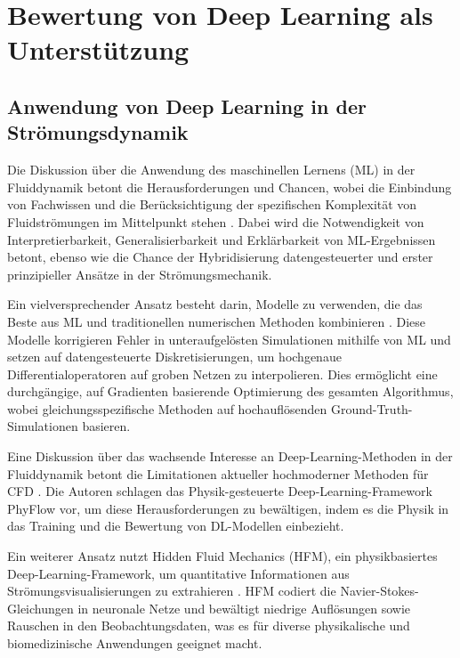 \section{Bewertung von Deep Learning als Unterstützung}

\subsection{Anwendung von Deep Learning in der Strömungsdynamik}
Die Diskussion über die Anwendung des maschinellen Lernens (ML) in der Fluiddynamik betont die Herausforderungen und Chancen, wobei die Einbindung von Fachwissen und die Berücksichtigung der spezifischen Komplexität von Fluidströmungen im Mittelpunkt stehen \parencite{bruntonMachineLearningFluid2020}. Dabei wird die Notwendigkeit von Interpretierbarkeit, Generalisierbarkeit und Erklärbarkeit von ML-Ergebnissen betont, ebenso wie die Chance der Hybridisierung datengesteuerter und erster prinzipieller Ansätze in der Strömungsmechanik.

Ein vielversprechender Ansatz besteht darin, \textquotedbl{} Modelle zu verwenden, die das Beste aus ML und traditionellen numerischen Methoden kombinieren \parencite{kochkovMachineLearningAccelerated2021}. Diese Modelle korrigieren Fehler in unteraufgelösten Simulationen mithilfe von ML und setzen auf datengesteuerte Diskretisierungen, um hochgenaue Differentialoperatoren auf groben Netzen zu interpolieren. Dies ermöglicht eine durchgängige, auf Gradienten basierende Optimierung des gesamten Algorithmus, wobei gleichungsspezifische Methoden auf hochauflösenden Ground-Truth-Simulationen basieren.

Eine Diskussion über das wachsende Interesse an Deep-Learning-Methoden in der Fluiddynamik betont die Limitationen aktueller hochmoderner Methoden für CFD \parencite{muralidharPhyFlowPhysicsGuidedDeep2021}. Die Autoren schlagen das Physik-gesteuerte Deep-Learning-Framework PhyFlow vor, um diese Herausforderungen zu bewältigen, indem es die Physik in das Training und die Bewertung von DL-Modellen einbezieht.

Ein weiterer Ansatz nutzt Hidden Fluid Mechanics (HFM), ein physikbasiertes Deep-Learning-Framework, um quantitative Informationen aus Strömungsvisualisierungen zu extrahieren \parencite{raissiHiddenFluidMechanics2020}. HFM codiert die Navier-Stokes-Gleichungen in neuronale Netze und bewältigt niedrige Auflösungen sowie Rauschen in den Beobachtungsdaten, was es für diverse physikalische und biomedizinische Anwendungen geeignet macht.

